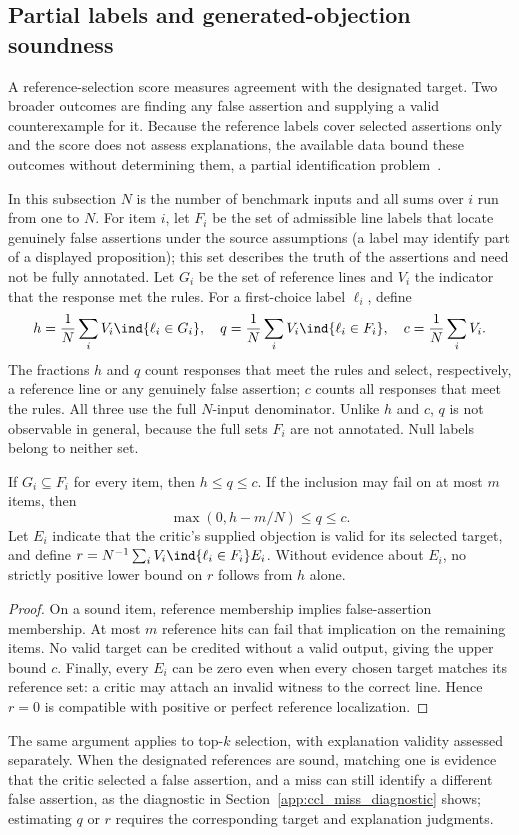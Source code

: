 \subsection{Partial labels and generated-objection soundness}
A reference-selection score measures agreement with the designated target. Two broader outcomes are finding any false assertion and supplying a valid counterexample for it. Because the reference labels cover selected assertions only and the score does not assess explanations, the available data bound these outcomes without determining them, a partial identification problem~\citep{manski2003partial}.

In this subsection $N$ is the number of benchmark inputs and all sums over $i$ run from one to $N$. For item $i$, let $F_i$ be the set of admissible line labels that locate genuinely false assertions under the source assumptions (a label may identify part of a displayed proposition); this set describes the truth of the assertions and need not be fully annotated. Let $G_i$ be the set of reference lines and $V_i$ the indicator that the response met the rules. For a first-choice label $\ell_i$, define
\[
h=\frac1N\sum_i V_i\ind\{\ell_i\in G_i\},\quad
q=\frac1N\sum_i V_i\ind\{\ell_i\in F_i\},\quad
c=\frac1N\sum_i V_i.
\]
The fractions $h$ and $q$ count responses that meet the rules and select, respectively, a reference line or any genuinely false assertion; $c$ counts all responses that meet the rules. All three use the full $N$-input denominator. Unlike $h$ and $c$, $q$ is not observable in general, because the full sets $F_i$ are not annotated. Null labels belong to neither set.
\begin{proposition}
\label{prop:partial}
If $G_i\subseteq F_i$ for every item, then $h\le q\le c$. If the inclusion may fail on at most $m$ items, then
\[
\max(0,h-m/N)\le q\le c.
\]
Let $E_i$ indicate that the critic's supplied objection is valid for its selected target, and define $r=N^{-1}\sum_i V_i\ind\{\ell_i\in F_i\}E_i$. Without evidence about $E_i$, no strictly positive lower bound on $r$ follows from $h$ alone.
\end{proposition}
\begin{proof}
On a sound item, reference membership implies false-assertion membership. At most $m$ reference hits can fail that implication on the remaining items. No valid target can be credited without a valid output, giving the upper bound $c$. Finally, every $E_i$ can be zero even when every chosen target matches its reference set: a critic may attach an invalid witness to the correct line. Hence $r=0$ is compatible with positive or perfect reference localization.
\end{proof}
The same argument applies to top-$k$ selection, with explanation validity assessed separately. When the designated references are sound, matching one is evidence that the critic selected a false assertion, and a miss can still identify a different false assertion, as the diagnostic in Section~\ref{app:ccl_miss_diagnostic} shows; estimating $q$ or $r$ requires the corresponding target and explanation judgments.


